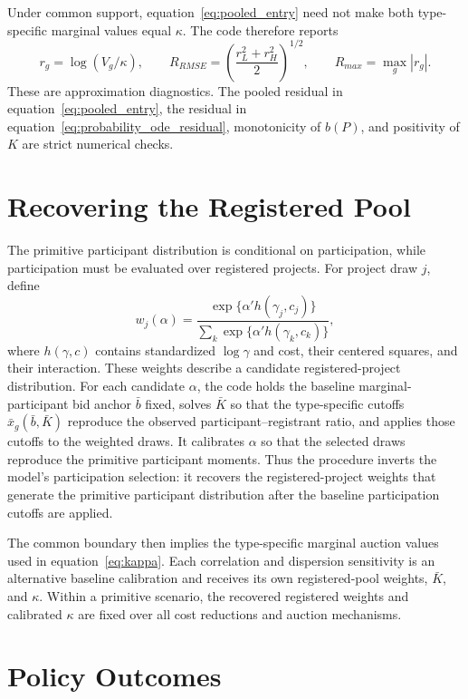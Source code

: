 \documentclass[10pt]{article}
\begin{document}
Under common support, equation~\eqref{eq:pooled_entry} need not make both
type-specific marginal values equal $\kappa$.  The code therefore reports
\begin{equation}
r_g=\log(V_g/\kappa),\qquad
R_{RMSE}=\left(\frac{r_L^2+r_H^2}{2}\right)^{1/2},\qquad
R_{max}=\max_g|r_g|.
\label{eq:type_residual}
\end{equation}
These are approximation diagnostics.  The pooled residual in
equation~\eqref{eq:pooled_entry}, the residual in
equation~\eqref{eq:probability_ode_residual}, monotonicity of $b(P)$, and
positivity of $K$ are strict numerical checks.

\section{Recovering the Registered Pool}

The primitive participant distribution is conditional on participation,
while participation must be evaluated over registered projects.  For project
draw $j$, define
\begin{equation}
w_j(\alpha)
=\frac{\exp\{\alpha'h(\gamma_j,c_j)\}}
{\sum_k\exp\{\alpha'h(\gamma_k,c_k)\}},
\label{eq:registered_weight}
\end{equation}
where $h(\gamma,c)$ contains standardized $\log\gamma$ and cost, their centered
squares, and their interaction.  These weights describe a candidate
registered-project distribution.  For each candidate $\alpha$, the code holds
the baseline marginal-participant bid anchor $\bar b$ fixed, solves $\bar K$
so that the type-specific cutoffs $\bar x_g(\bar b,\bar K)$ reproduce the
observed participant--registrant ratio, and applies those cutoffs to the
weighted draws.  It calibrates $\alpha$ so that the selected draws reproduce
the primitive participant moments.  Thus the procedure inverts the model's
participation selection: it recovers the registered-project weights that
generate the primitive participant distribution after the baseline
participation cutoffs are applied.

The common boundary then implies the type-specific marginal auction values
used in equation~\eqref{eq:kappa}.  Each correlation and dispersion sensitivity
is an alternative baseline calibration and receives its own registered-pool
weights, $\bar K$, and $\kappa$.  Within a primitive scenario, the recovered
registered weights and calibrated $\kappa$ are fixed over all cost reductions
and auction mechanisms.

\section{Policy Outcomes}
\end{document}
